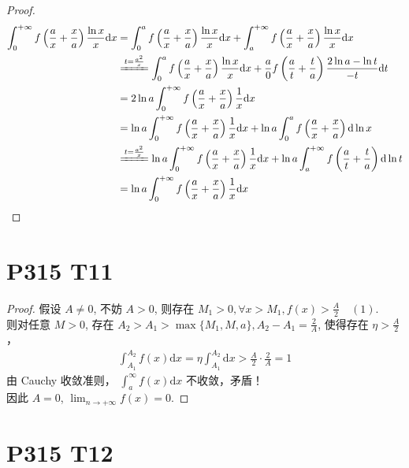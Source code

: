 \documentclass{article}
\newcommand{\dd}{\mathrm{d}}
\newcommand{\dx}{\dd x}
\newcommand{\dt}{\dd t}
\begin{document}
\begin{proof}
    \begin{align*}
        \int_{0}^{+\infty}f\left(\frac{a}{x} + \frac{x}{a}\right)\frac{\ln x}{x}\dx &= \int_{0}^{a}f\left(\frac{a}{x} + \frac{x}{a}\right)\frac{\ln x}{x}\dx + \int_{a}^{+\infty}f\left(\frac{a}{x} + \frac{x}{a}\right)\frac{\ln x}{x}\dx \\
        &\xlongequal{t = \frac{a^2}{x}} \int_{0}^{a}f\left(\frac{a}{x} + \frac{x}{a}\right)\frac{\ln x}{x}\dx + \frac{a}{0}f\left(\frac{a}{t} + \frac{t}{a}\right)\frac{2\ln a - \ln t}{-t}\dt \\
        &= 2\ln a \int_{0}^{+\infty}f\left(\frac{a}{x} + \frac{x}{a}\right)\frac{1}{x}\dx \\
        &= \ln a \int_{0}^{+\infty}f\left(\frac{a}{x} + \frac{x}{a}\right)\frac{1}{x}\dx + \ln a\int_{0}^{a}f\left(\frac{a}{x} + \frac{x}{a}\right)\dd \ln x \\
        &\xlongequal{t = \frac{a^2}{x}} \ln a \int_{0}^{+\infty}f\left(\frac{a}{x} + \frac{x}{a}\right)\frac{1}{x}\dx + \ln a\int_{a}^{+\infty}f\left(\frac{a}{t} + \frac{t}{a}\right)\dd \ln t \\
        &= \ln a \int_{0}^{+\infty}f\left(\frac{a}{x} + \frac{x}{a}\right)\frac{1}{x}\dx
    \end{align*}
\end{proof}

\section*{P315 T11}

\begin{proof}
    假设 $A \neq 0$, 不妨 $A > 0$, 则存在 $M_1 > 0, \forall x > M_1, f(x) > \frac{A}{2} \quad (1)$. \\
    则对任意 $M > 0$, 存在 $A_2 > A_1 > \max \{M_1, M, a\}, A_2 - A_1 = \frac{2}{A}$, 使得存在 $\eta > \frac{A}{2}$，
    \begin{align*}
        \int_{A_1}^{A_2}f(x)\dx = \eta\int_{A_1}^{A_2}\dx > \frac{A}{2}\cdot \frac{2}{A} = 1
    \end{align*}
    由 Cauchy 收敛准则， $\int_{a}^{\infty}f(x)\dx$ 不收敛，矛盾！ \\
    因此 $A = 0$, $\lim_{n \to +\infty}f(x) = 0$.
\end{proof}

\section*{P315 T12}
\end{document}
